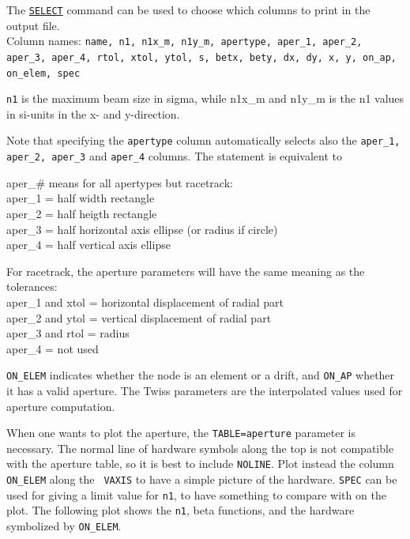The \hyperref[sec:select]{\tt SELECT} command can be  used to
choose which columns to print in the output file.   
\\ Column names: {\tt name, n1, n1x\_m, n1y\_m, apertype, aper\_1, aper\_2,
aper\_3, aper\_4, rtol, xtol, ytol, s, betx, bety, dx, dy, x, y, on\_ap,
on\_elem, spec}  

{\tt n1} is the maximum beam size in sigma, while n1x\_m and n1y\_m is the n1
values in si-units in the x- and y-direction.  

Note that specifying the {\tt apertype} column automatically selects also the
{\tt aper\_1, aper\_2, aper\_3} and {\tt aper\_4} columns. The statement
is equivalent to

aper\_\# means for all apertypes but racetrack:
\\ aper\_1 = half width rectangle
\\ aper\_2 = half heigth rectangle
\\ aper\_3 = half horizontal axis ellipse (or radius if circle)
\\ aper\_4 = half vertical axis ellipse

For racetrack, the aperture parameters will have the same meaning as the
tolerances: 
\\ aper\_1 and xtol = horizontal displacement of radial part 
\\ aper\_2 and ytol = vertical displacement of radial part 
\\ aper\_3 and rtol = radius 
\\ aper\_4 = not used 

{\tt ON\_ELEM} indicates whether the node is an element or a drift, and
{\tt ON\_AP} whether it has a valid aperture. The Twiss parameters are the
interpolated values used for aperture computation.  

When one wants to plot the aperture, the {\tt TABLE=aperture} parameter
is necessary. The normal line of hardware symbols along the top is not
compatible with the aperture table, so it is best to include
{\tt NOLINE}. Plot instead the column {\tt ON\_ELEM} along the {\tt
  VAXIS} to have a simple picture of the hardware. {\tt SPEC} can be
used for giving a limit value for {\tt n1}, to have something to compare
with on the plot. The following plot shows the {\tt n1}, beta functions,
and the hardware symbolized by {\tt ON\_ELEM}.     

